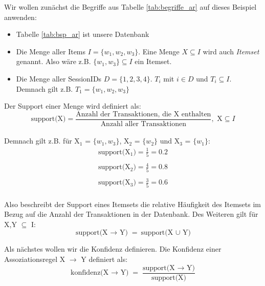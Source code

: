 Wir wollen zunächst die Begriffe aus Tabelle \ref{tab:begriffe_ar} auf dieses Beispiel anwenden:
\begin{itemize}
	\item Tabelle \ref{tab:bsp_ar} ist unsere Datenbank
	\item Die Menge aller Items $I = \{w_1, w_2, w_3\}$. Eine Menge $X \subseteq I$ wird auch \textit{Itemset} genannt. Also wäre z.B. $\{w_1, w_3\} \subseteq I$ ein Itemset.
	\item Die Menge aller SessionIDs $D = \{1,2,3,4\}$. $T_i$ mit $i \in D$ und $T_i \subseteq I$. Demnach gilt z.B. $T_1 = \{w_1,w_2,w_3\}$
\end{itemize}

Der Support einer Menge wird definiert als:\\

\begin{equation*}
	\text{support(X)} = \frac{\text{Anzahl der Transaktionen, die X enthalten}}{\text{Anzahl aller Transaktionen}}, \text{ X} \subseteq I
\end{equation*}\\

Demnach gilt z.B. für X$_1$ =  $\{w_1,w_3\}$, X$_2$ = $\{w_2\}$ und X$_3$ = $\{w_1\}$:\\
\begin{equation*}
	\begin{split}
		\text{support(X$_1$)} = \frac{1}{5} = 0.2\\
		\\
		\text{support(X$_2$)} = \frac{4}{5} = 0.8\\
		\\
		\text{support(X$_3$)} = \frac{3}{5} = 0.6\\
	\end{split}
\end{equation*}

Also beschreibt der Support eines Itemsets die relative Häufigkeit des Itemsets im Bezug auf die Anzahl der Transaktionen in der Datenbank. Des Weiteren gilt für X,Y $\subseteq$ I:\\
\begin{equation*}
	\text{support(X $\rightarrow$ Y)} = \text{support(X $\cup$ Y)}
\end{equation*}

Als nächstes wollen wir die Konfidenz definieren. Die Konfidenz einer Assoziationsregel X $\rightarrow$ Y definiert als:\\
\begin{equation*}
	\text{konfidenz(X $\rightarrow$ Y)} = \frac{\text{support(X $\rightarrow$ Y)}}{\text{support(X)}}
\end{equation*}

